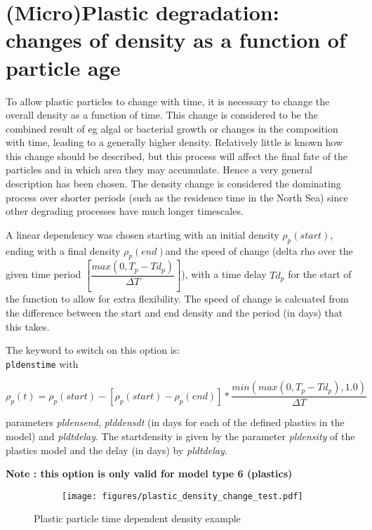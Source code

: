 \documentclass[english]{deltares_manual}
\begin{document}
\section{(Micro)Plastic degradation: changes of density as a function of particle age}
To allow plastic particles to change with time, it is necessary to change the overall density as a function of time. This change is considered to be the combined result of eg algal or bacterial growth or changes in the composition with time, leading to a generally higher density. Relatively little is known how this change should be described, but this process will affect the final fate of the particles and in which area they may accumulate. Hence a very general description has been chosen. The density change is considered the dominating process over shorter periods (such as the residence time in the North Sea) since other degrading processes have much longer timescales. 


A linear dependency was chosen starting with an initial density $\rho_{p}(start)$, ending with a final density $\rho_{p}(end)$and the speed of change (delta rho over the given time period $\left[ \dfrac{max(0, T_{p} - Td_{p})}{\Delta T} \right]$), with a time delay $Td_{p}$ for the start of the function to allow for extra flexibility. The speed of change is calcuated from the difference between the start and end density and the period (in days) that this takes.

The keyword to switch on this option is:\\
\texttt{pldenstime} with 

\begin{equation}\label{tdensity}
\rho_{p}(t) = \rho_{p}(start) - \left[ \rho_{p}(start)- \rho_{p}(end) \right] * \dfrac{min(max(0, T_{p} - Td_{p}),1.0)}{\Delta T}
\end{equation}

parameters \textit{pldensend}, \textit{plddensdt} (in days for each of the defined plastics in the model) and \textit{pldtdelay}. The startdensity is given by the parameter \textit{pldensity} of the plastics model and the delay (in days) by \textit{pldtdelay}. 

\textbf{Note : this option is only valid for model type 6 (plastics)}

\begin{figure}[H]%
		\begin{subfigure}{0.7\textwidth}
			\texttt{[image: figures/plastic\_density\_change\_test.pdf]}%
		\end{subfigure}
	\caption{Plastic particle time dependent density example}
	\label{fig:densitytime}
\end{figure}
\end{document}
